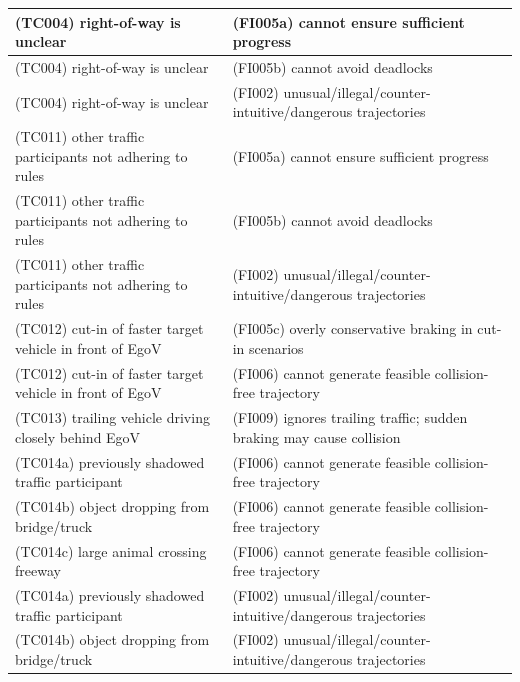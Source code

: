 \documentclass{article}
\begin{document}
\begin{longtable}{|p{8cm}|p{8cm}|}
\cellcolor{cYellow}(TC004) right-of-way is unclear& \cellcolor{cBlue}(FI005a) cannot ensure sufficient progress\\\hline
\cellcolor{cYellow}(TC004) right-of-way is unclear& \cellcolor{cBlue}(FI005b) cannot avoid deadlocks\\\hline
\cellcolor{cYellow}(TC004) right-of-way is unclear& \cellcolor{cBlue}(FI002) unusual/illegal/counter-intuitive/dangerous trajectories\\\hline
\cellcolor{cGreen}(TC011) other traffic participants not adhering to rules& \cellcolor{cBlue}(FI005a) cannot ensure sufficient progress\\\hline
\cellcolor{cGreen}(TC011) other traffic participants not adhering to rules& \cellcolor{cBlue}(FI005b) cannot avoid deadlocks\\\hline
\cellcolor{cGreen}(TC011) other traffic participants not adhering to rules& \cellcolor{cBlue}(FI002) unusual/illegal/counter-intuitive/dangerous trajectories\\\hline
\cellcolor{cGreen}(TC012) cut-in of faster target vehicle in front of EgoV& \cellcolor{cBlue}(FI005c) overly conservative braking in cut-in scenarios\\\hline
\cellcolor{cGreen}(TC012) cut-in of faster target vehicle in front of EgoV& \cellcolor{cBlue}(FI006) cannot generate feasible collision-free trajectory\\\hline
\cellcolor{cGreen}(TC013) trailing vehicle driving closely behind EgoV& \cellcolor{cGray}(FI009) ignores trailing traffic; sudden braking may cause collision\\\hline
\cellcolor{cGreen}(TC014a) previously shadowed traffic participant& \cellcolor{cBlue}(FI006) cannot generate feasible collision-free trajectory\\\hline
\cellcolor{cGreen}(TC014b) object dropping from bridge/truck& \cellcolor{cBlue}(FI006) cannot generate feasible collision-free trajectory\\\hline
\cellcolor{cGreen}(TC014c) large animal crossing freeway& \cellcolor{cBlue}(FI006) cannot generate feasible collision-free trajectory\\\hline
\cellcolor{cGreen}(TC014a) previously shadowed traffic participant& \cellcolor{cBlue}(FI002) unusual/illegal/counter-intuitive/dangerous trajectories\\\hline
\cellcolor{cGreen}(TC014b) object dropping from bridge/truck& \cellcolor{cBlue}(FI002) unusual/illegal/counter-intuitive/dangerous trajectories\\\hline

\end{longtable}
\end{document}
